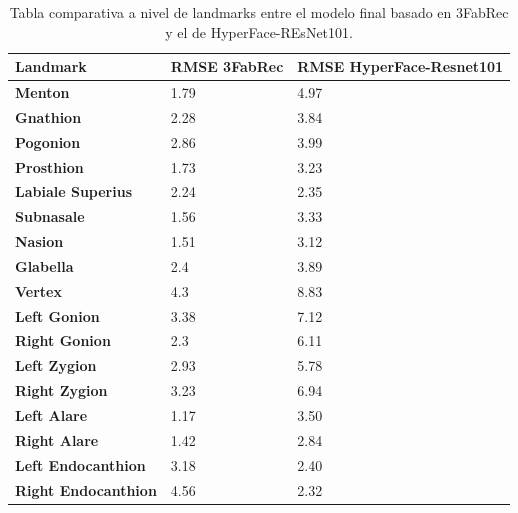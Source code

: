             \begin{table}[!ht]
                \centering
                \caption{Tabla comparativa a nivel de landmarks entre el modelo final basado en 3FabRec y el de HyperFace-REsNet101.}
                \begin{tabular}{|l|l|l|}
                \hline
                    \cellcolor{gray!25}\textbf{Landmark} & \cellcolor{gray!25}\textbf{RMSE 3FabRec} & \cellcolor{gray!25}\textbf{RMSE HyperFace-Resnet101} \\ \hline
                    \textbf{Menton} & \cellcolor{green!25}1.79 &  4.97 \\ \hline
                    \textbf{Gnathion} & \cellcolor{green!25}2.28 & 3.84 \\ \hline
                    \textbf{Pogonion} & \cellcolor{green!25}2.86 & 3.99 \\ \hline
                    \textbf{Prosthion} & \cellcolor{green!25}1.73 & 3.23 \\ \hline
                    \textbf{Labiale Superius} & \cellcolor{green!25}2.24 & 2.35 \\ \hline
                    \textbf{Subnasale} & \cellcolor{green!25}1.56 & 3.33 \\ \hline
                    \textbf{Nasion} & \cellcolor{green!25}1.51 & 3.12 \\ \hline
                    \textbf{Glabella} & \cellcolor{green!25}2.4 & 3.89 \\ \hline
                    \textbf{Vertex} & \cellcolor{green!25}4.3 & 8.83 \\ \hline
                    \textbf{Left Gonion} & \cellcolor{green!25}3.38 & 7.12 \\ \hline
                    \textbf{Right Gonion} & \cellcolor{green!25}2.3 & 6.11 \\ \hline
                    \textbf{Left Zygion} & \cellcolor{green!25}2.93 & 5.78 \\ \hline
                    \textbf{Right Zygion} & \cellcolor{green!25}3.23 & 6.94 \\ \hline
                    \textbf{Left Alare} & \cellcolor{green!25}1.17 & 3.50 \\ \hline
                    \textbf{Right Alare} & \cellcolor{green!25}1.42 & 2.84 \\ \hline
                    \textbf{Left Endocanthion} & 3.18 & \cellcolor{green!25}2.40 \\ \hline
                    \textbf{Right Endocanthion} & 4.56 & \cellcolor{green!25}2.32 \\ \hline

\end{tabular}
\end{table}
